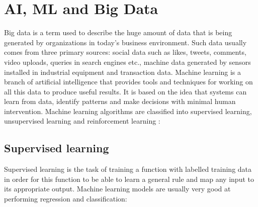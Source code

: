 \section{AI, ML and Big Data}
Big data is a term used to describe the huge amount of data that is being generated by organizations in today’s business environment. Such data usually comes from three primary sources: social data such as likes, tweets, comments, video uploads, queries in search engines etc., machine data generated by sensors installed in industrial equipment and transaction data. Machine learning is a branch of artificial intelligence that provides tools and techniques for working on all this data to produce useful results. It is based on the idea that systems can learn from data, identify patterns and make decisions with minimal human intervention. Machine learning algorithms are classified into supervised learning, unsupervised learning and reinforcement learning \cite{marketingml}: 

\subsection{Supervised learning}

Supervised learning is the task of training a function with labelled training data in order for this function to be able to learn a general rule and map any input to its appropriate output. Machine learning models are usually very good at performing regression and classification:

